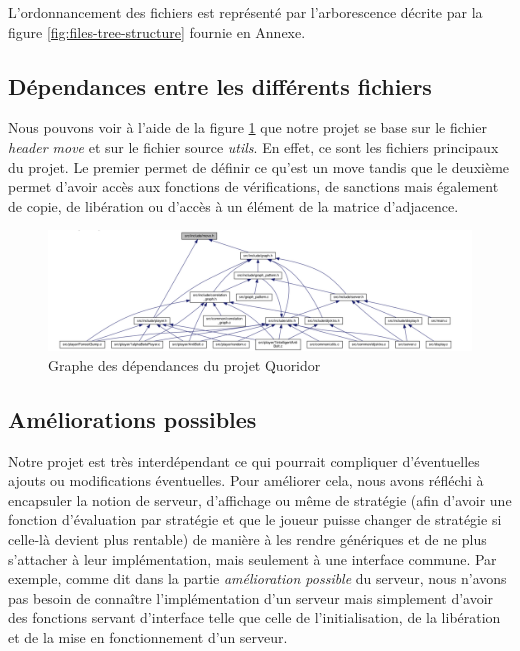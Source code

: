 \documentclass[11pt]{article}
\begin{document}
L'ordonnancement des fichiers est représenté par l'arborescence décrite par la figure \ref{fig:files-tree-structure} fournie en Annexe.

\subsection{Dépendances entre les différents fichiers}
Nous pouvons voir à l'aide de la figure \ref{fig:dependency-graph} que notre projet se base sur le fichier \textit{header move} et sur le fichier source \textit{utils}. En effet, ce sont les fichiers principaux du projet. Le premier permet de définir ce qu'est un move tandis que le deuxième permet d'avoir accès aux fonctions de vérifications, de sanctions mais également de copie, de libération ou d'accès à un élément de la matrice d'adjacence.

\begin{figure}[H]
    \centering
    \includegraphics[width=\linewidth]{./dependency-graph.png}
    \caption{Graphe des dépendances du projet Quoridor}
    \label{fig:dependency-graph}
\end{figure}

\subsection{Améliorations possibles}
Notre projet est très interdépendant ce qui pourrait compliquer d'éventuelles ajouts ou modifications éventuelles. Pour améliorer cela, nous avons réfléchi à encapsuler la notion de serveur, d'affichage ou même de stratégie (afin d'avoir une fonction d'évaluation par stratégie et que le joueur puisse changer de stratégie si celle-là devient plus rentable) de manière à les rendre génériques et de ne plus s'attacher à leur implémentation, mais seulement à une interface commune. Par exemple, comme dit dans la partie \textit{amélioration possible} du serveur, nous n'avons pas besoin de connaître l'implémentation d'un serveur mais simplement d'avoir des fonctions servant d'interface telle que celle de l'initialisation, de la libération et de la mise en fonctionnement d'un serveur.\\
\end{document}
